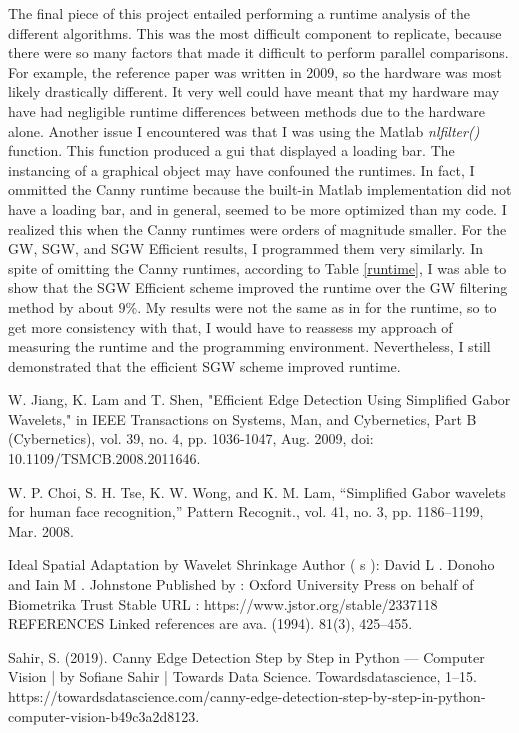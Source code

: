\documentclass[./rarnold_final_project.tex]{subfiles}
\begin{document}
\noindent The final piece of this project entailed performing a runtime analysis of the different algorithms.  This was the most difficult component to replicate, because there were so many factors that made it difficult to perform parallel comparisons.  For example, the reference paper was written in 2009, so the hardware was most likely drastically different.  It very well could have meant that my hardware may have had negligible runtime differences between methods due to the hardware alone.  Another issue I encountered was that I was using the Matlab \textit{nlfilter()} function.  This function produced a gui that displayed a loading bar.  The instancing of a graphical object may have confouned the runtimes.  In fact, I ommitted the Canny runtime because the built-in Matlab implementation did not have a loading bar, and in general, seemed to be more optimized than my code.  I realized this when the Canny runtimes were orders of magnitude smaller.  For the GW, SGW, and SGW Efficient results, I programmed them very similarly.  In spite of omitting the Canny runtimes, according to Table \ref{runtime}, I was able to show that the SGW Efficient scheme improved the runtime over the GW filtering method by about $9\%$.  My results were not the same as in \cite{main} for the runtime, so to get more consistency with that, I would have to reassess my approach of measuring the runtime and the programming environment.  Nevertheless, I still demonstrated that the efficient SGW scheme improved runtime.

\clearpage

\begin{thebibliography}{4}
W. Jiang, K. Lam and T. Shen, "Efficient Edge Detection Using Simplified Gabor Wavelets," in IEEE Transactions on Systems, Man, and Cybernetics, Part B (Cybernetics), vol. 39, no. 4, pp. 1036-1047, Aug. 2009, doi: 10.1109/TSMCB.2008.2011646.

W. P. Choi, S. H. Tse, K. W. Wong, and K. M. Lam, “Simplified Gabor
wavelets for human face recognition,” Pattern Recognit., vol. 41, no. 3,
pp. 1186–1199, Mar. 2008.

Ideal Spatial Adaptation by Wavelet Shrinkage Author ( s ): David L . Donoho and Iain M . Johnstone Published by : Oxford University Press on behalf of Biometrika Trust Stable URL : https://www.jstor.org/stable/2337118 REFERENCES Linked references are ava. (1994). 81(3), 425–455.

Sahir, S. (2019). Canny Edge Detection Step by Step in Python — Computer Vision | by Sofiane Sahir | Towards Data Science. Towardsdatascience, 1–15. https://towardsdatascience.com/canny-edge-detection-step-by-step-in-python-computer-vision-b49c3a2d8123.
\end{thebibliography}
\end{document}

